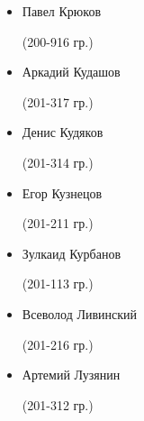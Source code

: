 \begin{multicols}{2}
\begin{small}
\begin{itemize}[leftmargin=*]
	\item[] Павел Крюков\begin{tiny} (200-916 гр.)\end{tiny} %
	\item[] Аркадий Кудашов\begin{tiny} (201-317 гр.)\end{tiny} %
	\item[] Денис Кудяков\begin{tiny} (201-314 гр.)\end{tiny} %
	\item[] Егор Кузнецов\begin{tiny} (201-211 гр.)\end{tiny}
	\item[] Зулкаид Курбанов\begin{tiny} (201-113 гр.)\end{tiny}

	\item[] Всеволод Ливинский\begin{tiny} (201-216 гр.)\end{tiny}
	\item[] Артемий Лузянин\begin{tiny} (201-312 гр.)\end{tiny} %


\end{itemize}
\end{small}
\end{multicols}

